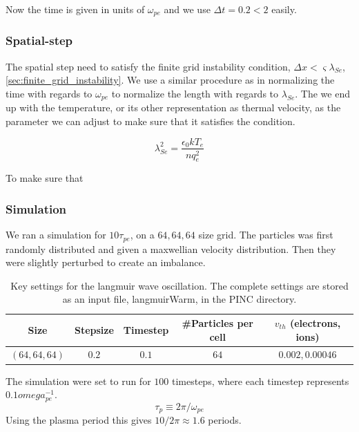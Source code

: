         Now the time is given in units of \(\omega_{pe}\) and we use \(\Delta t = 0.2 < 2\) easily.

        \subsubsection{Spatial-step}
        The spatial step need to satisfy the finite grid instability condition,
        \(\Delta x < \varsigma \lambda_{Se}\), \cref{sec:finite_grid_instability}.
        We use a similar procedure as in normalizing the time with regards to \(\omega_{pe}\)
        to normalize the length with regards to \(\lambda_{Se}\). The we end up with
        the temperature, or its other representation as thermal velocity, as the parameter we can adjust to make sure that it satisfies the
        condition.

        \begin{equation}
            \lambda_{Se}^2 = \frac{\epsilon_0 kT_e}{nq^2_e}
        \end{equation}

		To make sure that

		\subsubsection{Simulation}
			We ran a simulation for \(10\tau_{pe}\), on a \(64,64,64\) size grid. The particles
			was first randomly distributed and given a maxwellian velocity distribution.
			Then they were slightly perturbed to create an imbalance.

			\begin{table}
					\center
			\begin{tabular}{c|c|c|c|c}
				Size 			&	Stepsize &	Timestep &\#Particles per cell	& \(v_{th}\) (electrons, ions)
				\\ \hline
				\((64,64,64)\)	& \(0.2\)	& \(0.1\)  	&	\(64\)	& 		\(0.002, 0.00046\)
			\end{tabular}
			\caption{Key settings for the langmuir wave oscillation. The complete settings are
			stored as an input file, langmuirWarm, in the PINC directory.}
			\end{table}

			The simulation were set to run for \(100\) timesteps, where each timestep represents \(0.1omega_{pe}^{-1}\).
			\begin{equation}
				\tau_p \equiv 2\pi/\omega_{pe}
			\end{equation}
			Using the plasma period this gives \(10/2\pi\approx 1.6\) periods.

